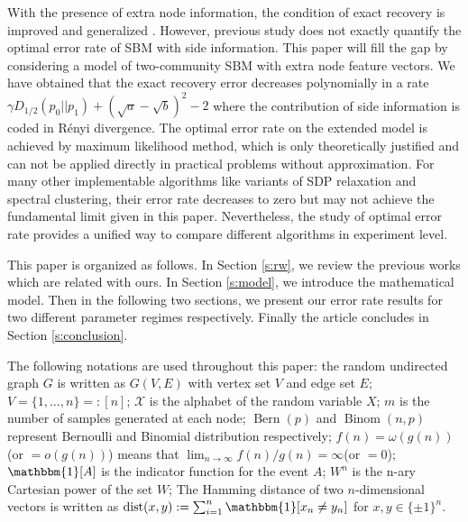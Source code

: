 \documentclass[conference,letterpaper]{IEEEtran}
\DeclareMathOperator{\dist}{dist}
\DeclareMathOperator{\Bern}{Bern}
\DeclareMathOperator{\Binom}{Binom}
\begin{document}
With the presence of extra node information, the condition of exact recovery is improved
and generalized \cite{saad2018community}. However, previous study does not exactly quantify the optimal error rate of SBM with side information. This paper will fill the gap by considering a model of two-community SBM with extra node feature vectors. We have obtained that
the exact recovery error decreases polynomially in a rate $\gamma D_{1/2}(p_0 || p_1) + (\sqrt{a} - \sqrt{b})^2 -2$
where the contribution of side information is coded in Rényi divergence.
The optimal error rate on the extended model is achieved by maximum likelihood method, which is only theoretically justified and can not be applied directly in practical problems without approximation. For many other implementable algorithms like variants of SDP relaxation and
spectral clustering, their error rate decreases to zero but may not achieve the fundamental limit given in this paper. Nevertheless, the study of optimal error rate provides a unified way to compare
different algorithms in experiment level.



This paper is organized as follows. In Section \ref{s:rw}, we review the previous works which are related with ours.
In Section \ref{s:model}, we introduce the mathematical model. Then in the following two sections,
we present our error rate results for two different parameter regimes respectively.
Finally the article concludes in Section \ref{s:conclusion}.

The following notations are used throughout this paper: 
the random undirected graph $G$ is written as $G(V,E)$ with vertex set $V$ and edge set $E$;
$V=\{1,\dots, n\} =: [n]$;
$\mathcal{X}$ is the alphabet
of the random variable $X$; $m$ is the number of samples generated at each node;
$\Bern(p)$ and $\Binom(n,p)$ represent Bernoulli
and Binomial distribution respectively; $f(n)=\omega(g(n))$(or $=o(g(n))$) means that $\lim_{n\to \infty} f(n) / g(n) = \infty $(or $=0$);
$\mathbbm{1}[A]$ is the indicator function for the event $A$; $W^n$ is the n-ary Cartesian power of the set $W$;
The Hamming distance of 
two $n$-dimensional vectors is written as $\dist(x,y):=\sum_{i=1}^n \mathbbm{1}[x_n\neq y_n]$ for $x,y\in \{\pm 1 \}^n$.
\end{document}
